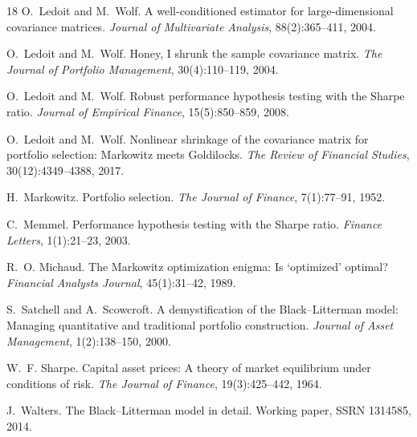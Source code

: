 \documentclass[a4paper,11pt]{article}
\theoremstyle{plain}
\theoremstyle{definition}
\begin{document}
\begin{thebibliography}{18}
O.~Ledoit and M.~Wolf.
\newblock A well-conditioned estimator for large-dimensional covariance
matrices.
\newblock \emph{Journal of Multivariate Analysis}, 88(2):365--411,
2004{}.

O.~Ledoit and M.~Wolf.
\newblock Honey, I shrunk the sample covariance matrix.
\newblock \emph{The Journal of Portfolio Management}, 30(4):110--119,
2004{}.

O.~Ledoit and M.~Wolf.
\newblock Robust performance hypothesis testing with the Sharpe ratio.
\newblock \emph{Journal of Empirical Finance}, 15(5):850--859, 2008.

O.~Ledoit and M.~Wolf.
\newblock Nonlinear shrinkage of the covariance matrix for portfolio
selection: Markowitz meets Goldilocks.
\newblock \emph{The Review of Financial Studies}, 30(12):4349--4388, 2017.

H.~Markowitz.
\newblock Portfolio selection.
\newblock \emph{The Journal of Finance}, 7(1):77--91, 1952.

C.~Memmel.
\newblock Performance hypothesis testing with the Sharpe ratio.
\newblock \emph{Finance Letters}, 1(1):21--23, 2003.

R.~O. Michaud.
\newblock The Markowitz optimization enigma: Is `optimized' optimal?
\newblock \emph{Financial Analysts Journal}, 45(1):31--42, 1989.

S.~Satchell and A.~Scowcroft.
\newblock A demystification of the Black--Litterman model: Managing
quantitative and traditional portfolio construction.
\newblock \emph{Journal of Asset Management}, 1(2):138--150, 2000.

W.~F. Sharpe.
\newblock Capital asset prices: A theory of market equilibrium under
conditions of risk.
\newblock \emph{The Journal of Finance}, 19(3):425--442, 1964.

J.~Walters.
\newblock The Black--Litterman model in detail.
\newblock Working paper, SSRN 1314585, 2014.

\end{thebibliography}
\end{document}
